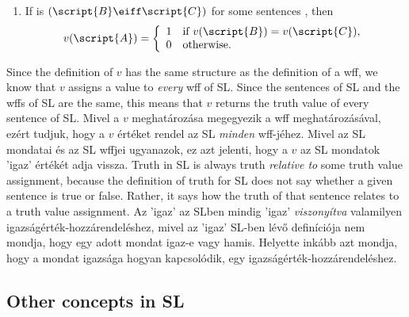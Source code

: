 \begin{enumerate}

\item If  is $(\script{B}\eiff\script{C})$ for some sentences , then
\begin{displaymath}v(\script{A}) =
	\left\{\begin{array}{ll}
	1 & \mbox{if $v(\script{B}) = v(\script{C})$},\\
	0 & \mbox{otherwise.}
	\end{array}\right.
\end{displaymath}
\end{enumerate}

Since the definition of $v$ has the same structure as the definition of a wff, we know that $v$ assigns a value to \emph{every} wff of SL. Since the sentences of SL and the wffs of SL are the same, this means that $v$ returns the truth value of every sentence of SL.
Mivel a $v$ meghatározása megegyezik a wff meghatározásával, ezért tudjuk, hogy a $v$ értéket rendel az SL \emph{minden} wff-jéhez. Mivel az SL mondatai és az SL wffjei ugyanazok, ez azt jelenti, hogy a $v$ az SL mondatok 'igaz' értékét adja vissza.
Truth in SL is always truth \emph{relative to} some truth value assignment, because the definition of truth for SL does not say whether a given sentence is true or false. Rather, it says how the truth of that sentence relates to a truth value assignment.
Az 'igaz' az SLben mindig 'igaz' \emph{viszonyítva} valamilyen igazságérték-hozzárendeléshez, mivel az 'igaz' SL-ben lévő definíciója nem mondja, hogy egy adott mondat igaz-e vagy hamis. Helyette inkább azt mondja, hogy a mondat igazsága hogyan kapcsolódik, egy igazságérték-hozzárendeléshez.
\subsection{Other concepts in SL}
